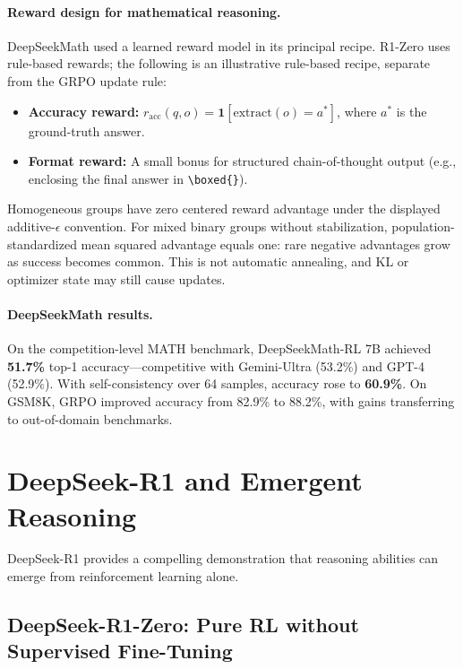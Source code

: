 \documentclass[12pt,a4paper]{report}
\begin{document}
\paragraph{Reward design for mathematical reasoning.}
DeepSeekMath\cite{shao2024deepseekmath} used a learned reward model in its principal recipe. R1-Zero uses rule-based rewards; the following is an illustrative rule-based recipe, separate from the GRPO update rule:
\begin{itemize}[leftmargin=1.8em,itemsep=2pt]
\item \textbf{Accuracy reward:} $r_{\text{acc}}(q, o) = \mathbf{1}[\text{extract}(o) = a^*]$, where $a^*$ is the ground-truth answer.
\item \textbf{Format reward:} A small bonus for structured chain-of-thought output (e.g., enclosing the final answer in \verb|\boxed{}|).
\end{itemize}

Homogeneous groups have zero centered reward advantage under the displayed additive-$\epsilon$ convention. For mixed binary groups without stabilization, population-standardized mean squared advantage equals one: rare negative advantages grow as success becomes common. This is not automatic annealing, and KL or optimizer state may still cause updates.

\paragraph{DeepSeekMath results.}
On the competition-level MATH benchmark, DeepSeekMath-RL 7B achieved \textbf{51.7\%} top-1 accuracy---competitive with Gemini-Ultra (53.2\%) and GPT-4 (52.9\%). With self-consistency over 64 samples, accuracy rose to \textbf{60.9\%}. On GSM8K, GRPO improved accuracy from 82.9\% to 88.2\%, with gains transferring to out-of-domain benchmarks.


\section{DeepSeek-R1 and Emergent Reasoning}
\label{sec:deepseek-r1}

DeepSeek-R1 \cite{deepseek2025r1} provides a compelling demonstration that reasoning abilities can emerge from reinforcement learning alone.

\subsection{DeepSeek-R1-Zero: Pure RL without Supervised Fine-Tuning}
\end{document}
